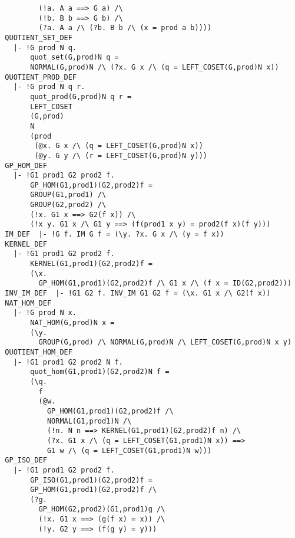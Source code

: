 \begin{verbatim}
          (!a. A a ==> G a) /\
          (!b. B b ==> G b) /\
          (?a. A a /\ (?b. B b /\ (x = prod a b))))
  QUOTIENT_SET_DEF
    |- !G prod N q.
        quot_set(G,prod)N q =
        NORMAL(G,prod)N /\ (?x. G x /\ (q = LEFT_COSET(G,prod)N x))
  QUOTIENT_PROD_DEF
    |- !G prod N q r.
        quot_prod(G,prod)N q r =
        LEFT_COSET
        (G,prod)
        N
        (prod
         (@x. G x /\ (q = LEFT_COSET(G,prod)N x))
         (@y. G y /\ (r = LEFT_COSET(G,prod)N y)))
  GP_HOM_DEF
    |- !G1 prod1 G2 prod2 f.
        GP_HOM(G1,prod1)(G2,prod2)f =
        GROUP(G1,prod1) /\
        GROUP(G2,prod2) /\
        (!x. G1 x ==> G2(f x)) /\
        (!x y. G1 x /\ G1 y ==> (f(prod1 x y) = prod2(f x)(f y)))
  IM_DEF  |- !G f. IM G f = (\y. ?x. G x /\ (y = f x))
  KERNEL_DEF
    |- !G1 prod1 G2 prod2 f.
        KERNEL(G1,prod1)(G2,prod2)f =
        (\x.
          GP_HOM(G1,prod1)(G2,prod2)f /\ G1 x /\ (f x = ID(G2,prod2)))
  INV_IM_DEF  |- !G1 G2 f. INV_IM G1 G2 f = (\x. G1 x /\ G2(f x))
  NAT_HOM_DEF
    |- !G prod N x.
        NAT_HOM(G,prod)N x =
        (\y.
          GROUP(G,prod) /\ NORMAL(G,prod)N /\ LEFT_COSET(G,prod)N x y)
  QUOTIENT_HOM_DEF
    |- !G1 prod1 G2 prod2 N f.
        quot_hom(G1,prod1)(G2,prod2)N f =
        (\q.
          f
          (@w.
            GP_HOM(G1,prod1)(G2,prod2)f /\
            NORMAL(G1,prod1)N /\
            (!n. N n ==> KERNEL(G1,prod1)(G2,prod2)f n) /\
            (?x. G1 x /\ (q = LEFT_COSET(G1,prod1)N x)) ==>
            G1 w /\ (q = LEFT_COSET(G1,prod1)N w)))
  GP_ISO_DEF
    |- !G1 prod1 G2 prod2 f.
        GP_ISO(G1,prod1)(G2,prod2)f =
        GP_HOM(G1,prod1)(G2,prod2)f /\
        (?g.
          GP_HOM(G2,prod2)(G1,prod1)g /\
          (!x. G1 x ==> (g(f x) = x)) /\
          (!y. G2 y ==> (f(g y) = y)))
  

\end{verbatim}
